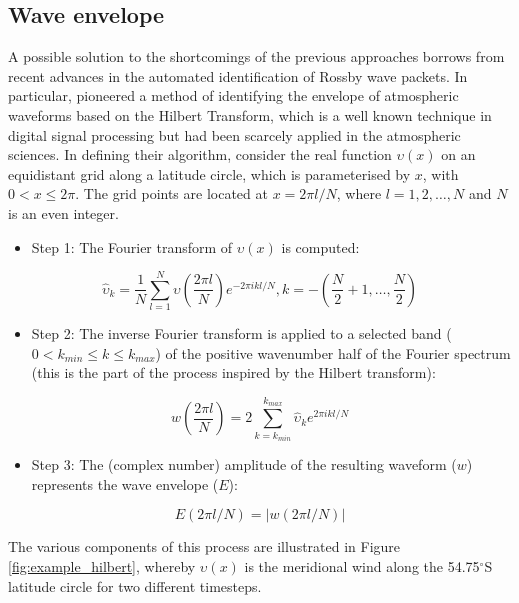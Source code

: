 \subsection{Wave envelope}

A possible solution to the shortcomings of the previous approaches borrows from recent advances in the automated identification of Rossby wave packets. In particular, \citet{Zimin2003} pioneered a method of identifying the envelope of atmospheric waveforms based on the Hilbert Transform, which is a well known technique in digital signal processing but had been scarcely applied in the atmospheric sciences. In defining their algorithm, \citet{Zimin2003} consider the real function $\upsilon(x)$ on an equidistant grid along a latitude circle, which is parameterised by $x$, with $0 < x \leq 2\pi$. The grid points are located at $x = 2 \pi l / N$, where $l = 1, 2, \dotsc, N$ and $N$ is an even integer.
\begin{itemize}
\item Step 1: The Fourier transform of $\upsilon(x)$ is computed:
\end{itemize}

\begin{equation}\label{eq:fourier_transform}
\hat{\upsilon}_k = \frac{1}{N}\sum_{l=1}^N \upsilon \left( \frac{2 \pi l}{N} \right) e^{-2 \pi ikl/N}, k = -\left( \frac{N}{2} + 1, \dotsc, \frac{N}{2} \right)
\end{equation}

\begin{itemize}
\item Step 2: The inverse Fourier transform is applied to a selected band ($0 < k_{min} \leq k \leq k_{max}$) of the positive wavenumber half of the Fourier spectrum (this is the part of the process inspired by the Hilbert transform):
\end{itemize}

\begin{equation}\label{eq:inverse_transform}
w \left( \frac{2 \pi l}{N} \right) = 2 \sum_{k=k_{min}}^{k_{max}} \hat{\upsilon}_k e^{2\pi ikl/N}
\end{equation}

\begin{itemize}
\item Step 3: The (complex number) amplitude of the resulting waveform ($w$) represents the wave envelope ($E$):
\end{itemize}

\begin{equation}\label{eq:wave_envelope}
E(2 \pi l / N) = | w(2 \pi l / N) |
\end{equation}

The various components of this process are illustrated in Figure \ref{fig:example_hilbert}, whereby $\upsilon(x)$ is the meridional wind along the 54.75$^{\circ}$S latitude circle for two different timesteps. 
